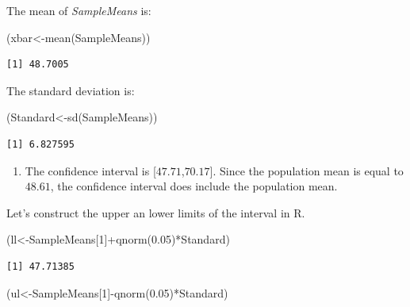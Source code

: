 \documentclass[
  letterpaper,
  DIV=11,
  numbers=noendperiod]{scrreprt}
\newenvironment{Shaded}{\begin{snugshade}}{\end{snugshade}}
\newcommand{\DecValTok}[1]{\textcolor[rgb]{0.68,0.00,0.00}{#1}}
\newcommand{\FloatTok}[1]{\textcolor[rgb]{0.68,0.00,0.00}{#1}}
\newcommand{\FunctionTok}[1]{\textcolor[rgb]{0.28,0.35,0.67}{#1}}
\newcommand{\NormalTok}[1]{\textcolor[rgb]{0.00,0.23,0.31}{#1}}
\newcommand{\OtherTok}[1]{\textcolor[rgb]{0.00,0.23,0.31}{#1}}
\newcommand{\SpecialCharTok}[1]{\textcolor[rgb]{0.37,0.37,0.37}{#1}}
\providecommand{\tightlist}{%
  \setlength{\itemsep}{0pt}\setlength{\parskip}{0pt}}\usepackage{longtable,booktabs,array}
\begin{document}
The mean of \emph{SampleMeans} is:

\begin{Shaded}
\begin{Highlighting}[numbers=left,,]
\NormalTok{(xbar}\OtherTok{\textless{}{-}}\FunctionTok{mean}\NormalTok{(SampleMeans))}
\end{Highlighting}
\end{Shaded}

\begin{verbatim}
[1] 48.7005
\end{verbatim}

The standard deviation is:

\begin{Shaded}
\begin{Highlighting}[numbers=left,,]
\NormalTok{(Standard}\OtherTok{\textless{}{-}}\FunctionTok{sd}\NormalTok{(SampleMeans))}
\end{Highlighting}
\end{Shaded}

\begin{verbatim}
[1] 6.827595
\end{verbatim}

\begin{enumerate}
\def\labelenumi{\arabic{enumi}.}
\setcounter{enumi}{2}
\tightlist
\item
  The confidence interval is {[}\(47.71\),\(70.17\){]}. Since the
  population mean is equal to \(48.61\), the confidence interval does
  include the population mean.
\end{enumerate}

Let's construct the upper an lower limits of the interval in R.

\begin{Shaded}
\begin{Highlighting}[numbers=left,,]
\NormalTok{(ll}\OtherTok{\textless{}{-}}\NormalTok{SampleMeans[}\DecValTok{1}\NormalTok{]}\SpecialCharTok{+}\FunctionTok{qnorm}\NormalTok{(}\FloatTok{0.05}\NormalTok{)}\SpecialCharTok{*}\NormalTok{Standard)}
\end{Highlighting}
\end{Shaded}

\begin{verbatim}
[1] 47.71385
\end{verbatim}

\begin{Shaded}
\begin{Highlighting}[numbers=left,,]
\NormalTok{(ul}\OtherTok{\textless{}{-}}\NormalTok{SampleMeans[}\DecValTok{1}\NormalTok{]}\SpecialCharTok{{-}}\FunctionTok{qnorm}\NormalTok{(}\FloatTok{0.05}\NormalTok{)}\SpecialCharTok{*}\NormalTok{Standard)}
\end{Highlighting}
\end{Shaded}
\end{document}
